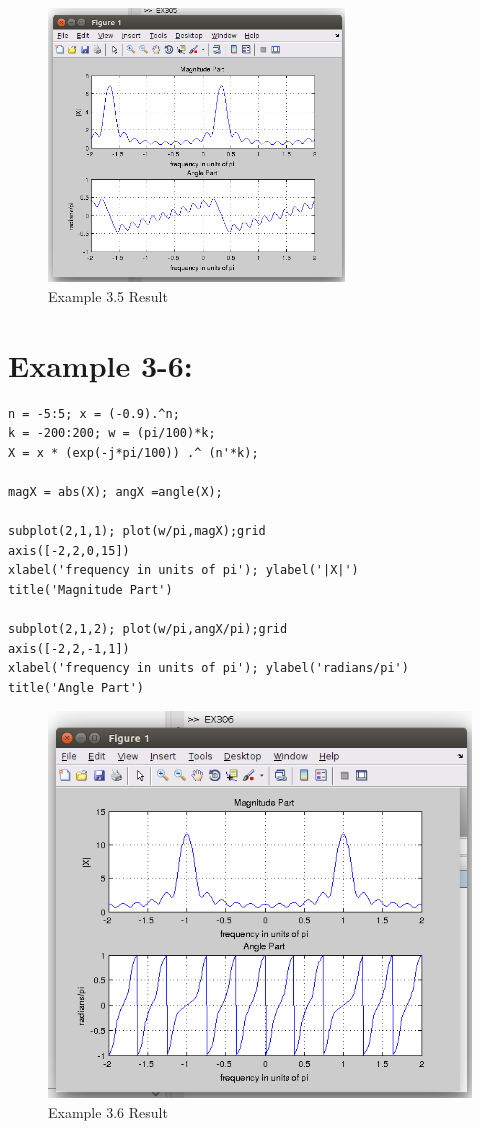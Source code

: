 \documentclass[11pt
  , a4paper
  , article
  , oneside
]{memoir}
\begin{document}
\begin{figure}[h!]
	\centering
	\includegraphics[width=0.7\textwidth,height=0.35\textwidth]{./images/Ex3-5.png}
	\caption{Example 3.5 Result}
	\label{fig:Example 3-5 Result}
\end{figure}

\clearpage

\chapter{Example 3-6:}
\begin{lstlisting}[style=termstyle]
%Example 3.6
n = -5:5; x = (-0.9).^n;
k = -200:200; w = (pi/100)*k;
X = x * (exp(-j*pi/100)) .^ (n'*k);

magX = abs(X); angX =angle(X);

subplot(2,1,1); plot(w/pi,magX);grid
axis([-2,2,0,15])
xlabel('frequency in units of pi'); ylabel('|X|')
title('Magnitude Part')

subplot(2,1,2); plot(w/pi,angX/pi);grid
axis([-2,2,-1,1])
xlabel('frequency in units of pi'); ylabel('radians/pi')
title('Angle Part')
\end{lstlisting}

\begin{figure}[h!]
	\centering
	\includegraphics{./images/Ex3-6.png}
	\caption{Example 3.6 Result}
	\label{fig:Example 3-6 Result}
\end{figure}
\end{document}
